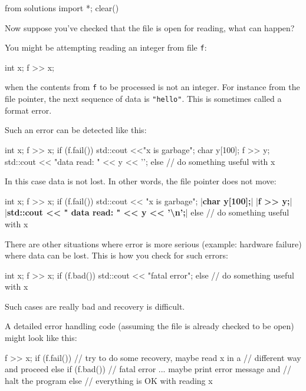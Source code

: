 \begin{python0}
from solutions import *; clear()
\end{python0}

Now suppose you've checked that the file is open for reading, what can happen?

You might be attempting reading an integer from file \texttt{f}:

\begin{console}
int x;
f >> x;
\end{console}

when the contents from \texttt{f} to be processed is not an integer. For instance from the file pointer, the next sequence of data is \texttt{"hello"}. This is sometimes called a format error.

Such an error can be detected like this:
\begin{console}
int x;
f >> x;
if (f.fail())
{  
    std::cout <<"x is garbage\n";
    char y[100];
    f >> y;
    std::cout << "data read: " << y << '\n';
}
else
{   
    // do something useful with x
}
\end{console}

In this case data is not lost. In other words, the file pointer does not
move:

\begin{consolethree}[escapeinside=||]
int x;
f >> x;
if (f.fail())
{    
     std::cout << "x is garbage\n";
     |\textbf{char y[100];}|
     |\textbf{f >> y;}|
     |\textbf{std::cout << " data read: " << y << '\textbackslash n';}|
}
else
{    
     // do something useful with x
}
\end{consolethree}

There are other situations where error is more serious (example:
hardware failure) where data can be lost. This is how you check for such
errors:

\begin{console}
int x;
f >> x;
if (f.bad())
{  
    std::cout << "fatal error\n";
}
else
{   
    // do something useful with x
}
\end{console}

Such cases are really bad and recovery is difficult.

A detailed error handling code (assuming the file is already checked to be open) might look like this:

\begin{console}
f >> x;
if (f.fail())
{   
    // try to do some recovery, maybe read x in a
    // different way and proceed
}
else if (f.bad())
{   
    // fatal error ... maybe print error message and
    // halt the program
}
else
{   
    // everything is OK with reading x
}
\end{console}

